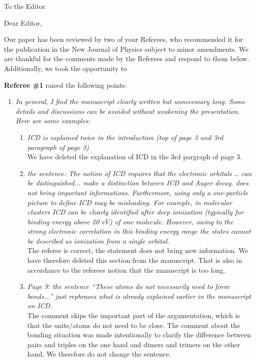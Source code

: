 \documentclass[DIN,pagenumber=false,parskip=half,fromalign=left,fromphone=true,fromemail=true,fromurl=false,fromlogo=false,fromrule=false]{scrlttr2}
\begin{document}
\begin{letter}{To the Editor}
	
	\opening{Dear Editor,}


Our paper has been reviewed by two of your Referees,
who recommended it for the publication in the
New Journal of Physics subject to minor amendments.
We are thankful for the comments made by the Referees and
respond to them below. Additionally, we took the opportunity to
{\color{blue}{correct some typos or whatever.}}

\textbf{Referee \#1} raised the following points:

\begin{enumerate}
 \item \emph{In general, I find the manuscript clearly written but unnecessary long. Some details and discussions can be avoided without weakening the presentation. Here are some examples:}
  \begin{enumerate}
   \item \emph{ICD is explained twice in the introduction (top of page 3 and
         3rd paragraph of page 3)}\\
				
				We have deleted the explanation of ICD in the 3rd pargraph of page 3.
				
   \item \emph{the sentence: The notion of ICD requires that the electronic orbitals … can be distinguished... make a distinction between ICD and Auger decay. does not bring important informations. Furthermore, using only a one-particle picture to define ICD may be misleading. For example, in molecular clusters ICD can be clearly identified after deep ionization (typically for binding energy above 20 eV) of one molecule. However, owing to the strong electronic correlation in this binding energy range the states cannot be described as ionization from a single orbital.}\\
				The referee is correct, the statement does not bring new information. We have therefore deleted this section from the manuscript. That is also in accordance to the referees notion that the manuscript is too long. 
   \item \emph{Page 9: the sentence “These atoms do not necessarily need to form bonds...” just rephrases what is already explained earlier in the manuscript on ICD.}\vspace{0.3cm}\\
         The comment skips the important part of the argumentation, which is
         that the units/atoms do not need to be close. The comment about the
         bonding situation was made intentionally to clarify the difference
         between pairs and triples on the one hand and dimers and trimers on
         the other hand. We therefore do not change the sentence.


\end{enumerate}
\end{enumerate}
\end{letter}
\end{document}
